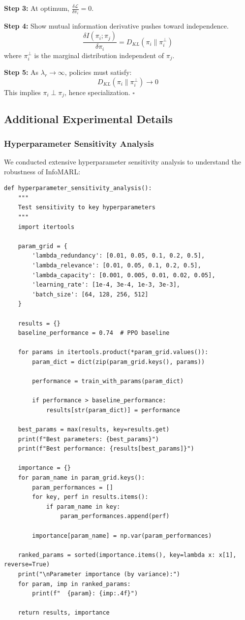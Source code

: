 \documentclass[10pt, letterpaper]{article}
\begin{document}
\textbf{Step 3:} At optimum, $\frac{\delta \mathcal{L}}{\delta \pi_i} = 0$.

\textbf{Step 4:} Show mutual information derivative pushes toward independence.
\[\frac{\delta I(\pi_i; \pi_j)}{\delta \pi_i} = D_{KL}(\pi_i \| \pi^{\perp}_i)\]
where $\pi^{\perp}_i$ is the marginal distribution independent of $\pi_j$.

\textbf{Step 5:} As $\lambda_r \to \infty$, policies must satisfy:
\[D_{KL}(\pi_i \| \pi^{\perp}_i) \to 0\]
This implies $\pi_i \perp \pi_j$, hence specialization. $\square$

\subsection{Additional Experimental Details}

\subsubsection{Hyperparameter Sensitivity Analysis}

We conducted extensive hyperparameter sensitivity analysis to understand the robustness of InfoMARL:

\begin{lstlisting}
def hyperparameter_sensitivity_analysis():
    """
    Test sensitivity to key hyperparameters
    """
    import itertools

    param_grid = {
        'lambda_redundancy': [0.01, 0.05, 0.1, 0.2, 0.5],
        'lambda_relevance': [0.01, 0.05, 0.1, 0.2, 0.5],
        'lambda_capacity': [0.001, 0.005, 0.01, 0.02, 0.05],
        'learning_rate': [1e-4, 3e-4, 1e-3, 3e-3],
        'batch_size': [64, 128, 256, 512]
    }

    results = {}
    baseline_performance = 0.74  # PPO baseline

    for params in itertools.product(*param_grid.values()):
        param_dict = dict(zip(param_grid.keys(), params))

        performance = train_with_params(param_dict)

        if performance > baseline_performance:
            results[str(param_dict)] = performance

    best_params = max(results, key=results.get)
    print(f"Best parameters: {best_params}")
    print(f"Best performance: {results[best_params]}")

    importance = {}
    for param_name in param_grid.keys():
        param_performances = []
        for key, perf in results.items():
            if param_name in key:
                param_performances.append(perf)

        importance[param_name] = np.var(param_performances)

    ranked_params = sorted(importance.items(), key=lambda x: x[1], reverse=True)
    print("\nParameter importance (by variance):")
    for param, imp in ranked_params:
        print(f"  {param}: {imp:.4f}")

    return results, importance
\end{lstlisting}
\end{document}
